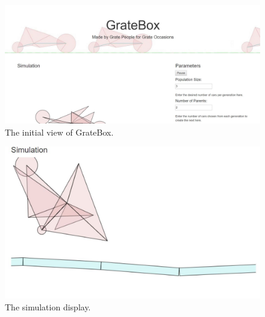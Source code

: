 \documentclass{article}
\begin{document}
\begin{figure}
  \includegraphics[width=\linewidth]{Images/GrateBoxFirstScreen.JPG}
  \caption{The initial view of GrateBox.}
  \label{fig:First1}
\end{figure}

\begin{figure}
  \includegraphics[width=\linewidth]{Images/GrateBoxSimulation.JPG}
  \caption{The simulation display.}
  \label{fig:Sim1}
\end{figure}
\end{document}
